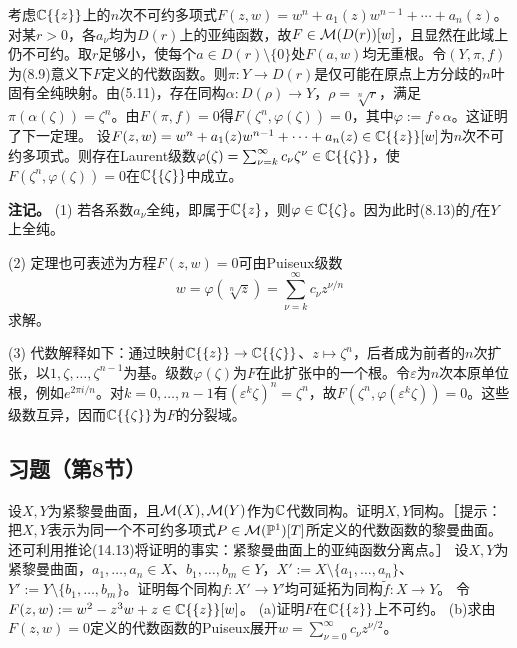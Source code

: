 考虑$\mathbb C\{\{z\}\}$上的$n$次不可约多项式$F(z,w)=w^n+a_1(z)w^{n-1}+\cdots+a_n(z)$。
对某$r>0$，各$a_\nu$均为$D(r)$上的亚纯函数，故$F\in\mathcal M(D(r))[w]$，且显然在此域上仍不可约。取$r$足够小，使每个$a\in D(r)\setminus\{0\}$处$F(a,w)$均无重根。令$(Y,\pi,f)$为(8.9)意义下$F$定义的代数函数。则$\pi:Y\to D(r)$是仅可能在原点上方分歧的$n$叶固有全纯映射。由(5.11)，存在同构$\alpha:D(\rho)\to Y$，$\rho=\sqrt[n]r$，满足$\pi(\alpha(\zeta))=\zeta^n$。由$F(\pi,f)=0$得$F(\zeta^n,\varphi(\zeta))=0$，其中$\varphi:=f\circ\alpha$。这证明了下一定理。
设$F(z,w)=w^n+a_1(z)w^{n-1}+\cdots+a_n(z)\in\mathbb C\{\{z\}\}[w]$为$n$次不可约多项式。则存在Laurent级数$\varphi(\zeta)=\sum_{\nu=k}^\infty c_\nu\zeta^\nu\in\mathbb C\{\{\zeta\}\}$，使$F(\zeta^n,\varphi(\zeta))=0$在$\mathbb C\{\{\zeta\}\}$中成立。

\textbf{注记。}
(1) 若各系数$a_\nu$全纯，即属于$\mathbb C\{z\}$，则$\varphi\in\mathbb C\{\zeta\}$。因为此时(8.13)的$f$在$Y$上全纯。

(2) 定理也可表述为方程$F(z,w)=0$可由Puiseux级数
\[
w=\varphi(\sqrt[n]z)=\sum_{\nu=k}^\infty c_\nu z^{\nu/n}
\]
求解。

(3) 代数解释如下：通过映射$\mathbb C\{\{z\}\}\to\mathbb C\{\{\zeta\}\}$、$z\mapsto\zeta^n$，后者成为前者的$n$次扩张，以$1,\zeta,\ldots,\zeta^{n-1}$为基。级数$\varphi(\zeta)$为$F$在此扩张中的一个根。令$\varepsilon$为$n$次本原单位根，例如$e^{2\pi i/n}$。对$k=0,\ldots,n-1$有$(\varepsilon^k\zeta)^n=\zeta^n$，故$F(\zeta^n,\varphi(\varepsilon^k\zeta))=0$。这些级数互异，因而$\mathbb C\{\{\zeta\}\}$为$F$的分裂域。
\subsection*{习题（第8节）}
设$X,Y$为紧黎曼曲面，且$\mathcal M(X),\mathcal M(Y)$作为$\mathbb C$代数同构。证明$X,Y$同构。［提示：把$X,Y$表示为同一个不可约多项式$P\in\mathcal M(\mathbb P^1)[T]$所定义的代数函数的黎曼曲面。还可利用推论(14.13)将证明的事实：紧黎曼曲面上的亚纯函数分离点。］
设$X,Y$为紧黎曼曲面，$a_1,\ldots,a_n\in X$、$b_1,\ldots,b_m\in Y$，$X':=X\setminus\{a_1,\ldots,a_n\}$、$Y':=Y\setminus\{b_1,\ldots,b_m\}$。证明每个同构$f:X'\to Y'$均可延拓为同构$\widetilde f:X\to Y$。
令$F(z,w):=w^2-z^3w+z\in\mathbb C\{\{z\}\}[w]$。
(a)证明$F$在$\mathbb C\{\{z\}\}$上不可约。
(b)求由$F(z,w)=0$定义的代数函数的Puiseux展开$w=\sum_{\nu=0}^\infty c_\nu z^{\nu/2}$。
